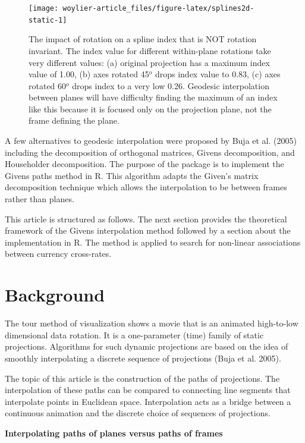 \begin{figure}
\texttt{[image: woylier-article\_files/figure-latex/splines2d-static-1]} \caption{The impact of rotation on a spline index that is NOT rotation invariant. The index value for different within-plane rotations take very different values: (a) original projection has a maximum index value of 1.00, (b) axes rotated 45$^o$ drops index value to 0.83, (c) axes rotated 60$^o$ drops index to a very low 0.26. Geodesic interpolation between planes will have difficulty finding the maximum of an index like this because it is focused only on the projection plane, not the frame defining the plane.}\label{fig:splines2d-static}
\end{figure}

A few alternatives to geodesic interpolation were proposed by Buja et al. (2005) including the decomposition of orthogonal matrices, Givens decomposition, and Householder decomposition. The purpose of the  package is to implement the Givens paths method in R. This algorithm adapts the Given's matrix decomposition technique which allows the interpolation to be between frames rather than planes.

This article is structured as follows. The next section provides the theoretical framework of the Givens interpolation method followed by a section about the implementation in R. The method is applied to search for non-linear associations between currency cross-rates.

\hypertarget{background}{%
\section{Background}\label{background}}

The tour method of visualization shows a movie that is an animated high-to-low dimensional data rotation. It is a one-parameter (time) family of static projections. Algorithms for such dynamic projections are based on the idea of smoothly interpolating a discrete sequence of projections (Buja et al. 2005).

The topic of this article is the construction of the paths of projections. The interpolation of these paths can be compared to connecting line segments that interpolate points in Euclidean space. Interpolation acts as a bridge between a continuous animation and the discrete choice of sequences of projections.

\textbf{Interpolating paths of planes versus paths of frames}

